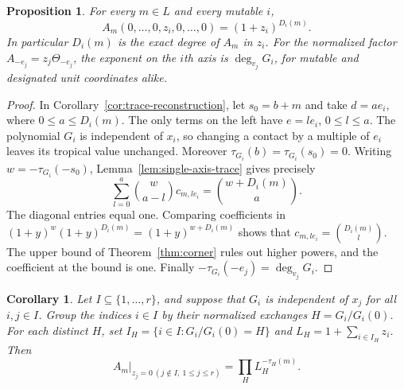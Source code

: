 \documentclass[11pt,reqno]{amsart}
\numberwithin{equation}{section}
\newtheorem{proposition}[theorem]{Proposition}
\newtheorem{corollary}[theorem]{Corollary}
\theoremstyle{definition}
\theoremstyle{remark}
\begin{document}
\begin{proposition}\label{prop:axis}
For every \(m\in L\) and every mutable \(i\),
\[ A_m(0,\ldots,0,z_i,0,\ldots,0)=(1+z_i)^{D_i(m)}. \]
In particular \(D_i(m)\) is the exact degree of \(A_m\) in \(z_i\).
For the normalized factor \(A_{-e_j}=z_j\Theta_{-e_j}\), the exponent on
the \(i\)th axis is \(\deg_{v_j}G_i\), for mutable and designated
unit coordinates alike.
\end{proposition}

\begin{proof}
In Corollary~\ref{cor:trace-reconstruction}, let \(s_0=b+m\) and take \(d=a e_i\),
where \(0\le a\le D_i(m)\). The only terms on the left have \(e=l e_i\), \(0\le l\le a\).
The polynomial \(G_i\) is independent of \(x_i\), so changing a
contact by a multiple of \(e_i\) leaves its tropical value unchanged.
Moreover \(\tau_{G_i}(b)=\tau_{G_i}(s_0)=0\).
Writing \(w=-\tau_{G_i}(-s_0)\), Lemma~\ref{lem:single-axis-trace}
gives precisely
\[ \sum_{l=0}^a \binom{w}{a-l} c_{m,l e_i} =\binom{w+D_i(m)}a. \]
The diagonal entries equal one. Comparing coefficients in
\((1+y)^w(1+y)^{D_i(m)}=(1+y)^{w+D_i(m)}\) shows that
\(c_{m,l e_i}=\binom{D_i(m)}l\). The upper bound of
Theorem~\ref{thm:corner} rules out higher powers, and the coefficient
at the bound is one. Finally
\(-\tau_{G_i}(-e_j)=\deg_{v_j}G_i\).
\end{proof}

\begin{corollary}\label{cor:independent-face}
Let \(I\subseteq\{1,\ldots,r\}\), and suppose that \(G_i\) is
independent of \(x_j\) for all \(i,j\in I\). Group the indices
\(i\in I\) by their normalized exchanges \(H=G_i/G_i(0)\).
For each distinct \(H\), set \(I_H=\{i\in I:G_i/G_i(0)=H\}\) and
\(L_H=1+\sum_{i\in I_H}z_i\). Then
\[ \left.A_m\right|_{z_j=0\ (j\notin I,\ 1\le j\le r)}=\prod_H L_H^{-\tau_H(m)}. \]
\end{corollary}
\end{document}
